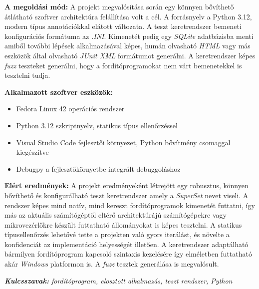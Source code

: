 \noindent
\textbf{A megoldási mód:} A projekt megvalósítása során egy könnyen bővíthető átlátható szoftver architektúra
felállítása volt a cél. A forrásnyelv a Python 3.12, modern típus annotációkkal elátott változata. A teszt keretrendszer
bemeneti konfigurációs formátuma az \textit{.INI}. Kimenetét pedig egy \textit{SQLite} adatbázisba menti amiből további
lépések alkalmazásával képes, humán olvasható \textit{HTML} vagy más eszközök által olvasható \textit{JUnit XML}
formátumot generálni. A keretrendszer képes \textit{fuzz} teszteket generálni, hogy a fordítóprogramokat nem várt
bemenetekkel is tesztelni tudja.

\noindent
\textbf{Alkalmazott szoftver eszközök:}
\begin{itemize}
    \item Fedora Linux 42 operációs rendszer
    \item Python 3.12 szkriptnyelv, statikus típus ellenőrzéssel
    \item Visual Studio Code fejlesztői környezet, Python bővítmény csomaggal kiegészítve
    \item Debugpy a fejlesztőkörnyetbe integrált debuggoláshoz
\end{itemize}

\noindent
\textbf{Elért eredmények:} A projekt eredményeként létrejött egy robusztus, könnyen bővíthető és konfigurálható teszt
keretrendszer amely a \textit{SuperSet} nevet viseli. A rendszer képes mind natív, mind kereszt fordítóprogramok
kimenetét futtatni, így más az aktuális számítógéptől eltérő architektúrájú számítógépekre vagy mikrovezérlőkre készült
futtatható állományokat is képes tesztelni. A statikus típusellenőrzés lehetővé tette a projekten való gyors iterálást,
és növelte a konfidenciát az implementáció helyességét illetően. A keretrendszer adaptálható bármilyen fordítóprogram
kapcsoló szintaxis kezelésére így elméletben futtatható akár \textit{Windows} platformon is. A \textit{fuzz} tesztek
generálása is megvalósult.

\noindent
\textit{\textbf{Kulcsszavak:} fordítóprogram, elosztott alkalmazás, teszt rendszer, Python}
